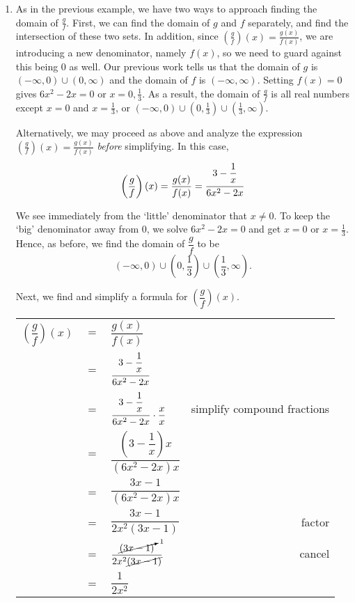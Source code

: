 {\begin{enumerate}
\item  As in the previous example, we have two ways to approach finding the domain of $\frac{g}{f}$.  First, we can find the domain of $g$ and $f$ separately, and find the intersection of these two sets.  In addition, since $\left(\frac{g}{f}\right)(x) = \frac{g(x)}{f(x)}$, we are introducing a new denominator, namely $f(x)$, so we need to guard against this being $0$ as well.  Our previous work tells us that the domain of $g$ is $(-\infty, 0) \cup (0, \infty)$ and the domain of $f$ is $(-\infty, \infty)$.  Setting $f(x) = 0$ gives $6x^2 - 2x = 0$ or $x = 0, \frac{1}{3}$.  As a result, the domain of $\frac{g}{f}$ is all real numbers except $x = 0$ and $x = \frac{1}{3}$, or $(-\infty, 0) \cup \left(0, \frac{1}{3} \right) \cup \left( \frac{1}{3}, \infty \right)$.

Alternatively, we may proceed as above and analyze the expression $\left(\frac{g}{f}\right)(x) = \frac{g(x)}{f(x)}$ \textit{before} simplifying.  In this case, \[ \left(\dfrac{g}{f}\right)(x) = \dfrac{g(x)}{f(x)}  = \dfrac{3-\dfrac{1}{x}\vphantom{\left(\dfrac{1}{x}\right)}}{6x^2 - 2x}\]

We see immediately from the `little' denominator that $x \neq 0$.  To keep the `big' denominator away from $0$, we solve $6x^2 - 2x = 0$ and get $x = 0$ or $x = \frac{1}{3}$.  Hence, as before, we find the domain of $\dfrac{g}{f}$ to be 
\[
(-\infty, 0) \cup \left(0, \frac{1}{3}\right) \cup \left(\frac{1}{3}, \infty\right).
\]

Next, we find and simplify a formula for $\left(\dfrac{g}{f}\right)(x)$.

\setlength{\extrarowheight}{12pt}

\begin{longtable}{rclr}
 
$\left( \dfrac{g}{f}\right)(x)$ & $=$ & $\dfrac{g(x)}{f(x)} $  & \\
& = & $\dfrac{3-\dfrac{1}{x}\vphantom{\left(\dfrac{1}{x}\right)}}{6x^2 - 2x}$ & \\[.125in]
& = & $\dfrac{3-\dfrac{1}{x}\vphantom{\left(\dfrac{1}{x}\right)}}{6x^2 - 2x} \cdot \dfrac{x}{x}$ & simplify compound fractions  \\[.125in]
& = & $\dfrac{\left(3-\dfrac{1}{x}\right) x}{\left(6x^2 - 2x\right)x}$ & \\
& = & $\dfrac{3x-1}{\left(6x^2 - 2x\right)x}$ & \\
& = & $\dfrac{3x-1}{2x^2(3x-1)}$ & factor \\
& = & $\dfrac{\cancelto{1}{(3x-1)}}{2x^2\cancel{(3x-1)}}$ & cancel \\
& = & $\dfrac{1}{2x^2}$ &  \\

\end{longtable} 

\setlength{\extrarowheight}{2pt}

\end{enumerate}
}

